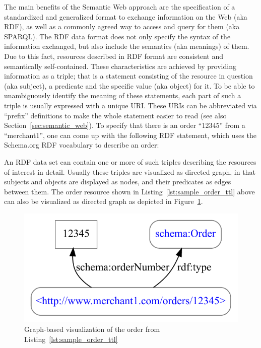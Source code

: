 The main benefits of the Semantic Web approach are the specification of a standardized and generalized format to exchange information on the Web (aka \gls{RDF}), as well as a commonly agreed way to access and query for them (aka \gls{SPARQL}). The \gls{RDF} data format does not only specify the syntax of the information exchanged, but also include the semantics (aka meanings) of them. Due to this fact, resources described in \gls{RDF} format are consistent and semantically self-contained. These characteristics are achieved by providing information as a triple; that is a statement consisting of the resource in question (aka subject), a predicate and the specific value (aka object) for it. To be able to unambiguously identify the meaning of these statements, each part of such a triple is usually expressed with a unique \gls{URI}. These \gls{URI}s can be abbreviated via ``prefix'' definitions to make the whole statement easier to read (see also Section~\ref{sec:semantic_web}). To specify that there is an order ``12345'' from a ``merchant1'', one can come up with the following \gls{RDF} statement, which uses the Schema.org \gls{RDF} vocabulary \citep{Schema.org} to describe an order: \@


An \gls{RDF} data set can contain one or more of such triples describing the resources of interest in detail. Usually these triples are visualized as directed graph, in that subjects and objects are displayed as nodes, and their predicates as edges between them. The order resource shown in Listing~\ref{lst:sample_order_ttl} above can also be visualized as directed graph as depicted in Figure~\ref{fig:sample_order_graph_image}. \@

\begin{figure}[H]
  \centering
  \includegraphics[width=0.6\columnwidth]{images/sample_order_12345.pdf}
  \caption{Graph-based visualization of the order from Listing~\ref{lst:sample_order_ttl}}
\label{fig:sample_order_graph_image}
\end{figure}

